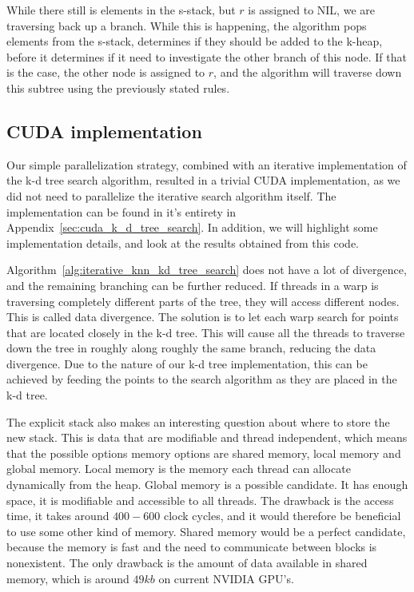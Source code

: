 While there still is elements in the s-stack, but $r$ is assigned to NIL, we are traversing back up a branch. While this is happening, the algorithm pops elements from the s-stack, determines if they should be added to the k-heap, before it determines if it need to investigate the other branch of this node. If that is the case, the other node is assigned to $r$, and the algorithm will traverse down this subtree using the previously stated rules.

\subsection{CUDA implementation} %
\label{sub:the_implementation}

Our simple parallelization strategy, combined with an iterative implementation of the k-d tree search algorithm, resulted in a trivial CUDA implementation, as we did not need to parallelize the iterative search algorithm itself. The implementation can be found in it's entirety in Appendix~\ref{sec:cuda_k_d_tree_search}. In addition, we will highlight some implementation details, and look at the results obtained from this code.

Algorithm~\ref{alg:iterative_knn_kd_tree_search} does not have a lot of divergence, and the remaining branching can be further reduced. If threads in a warp is traversing completely different parts of the tree, they will access different nodes. This is called data divergence. The solution is to let each warp search for points that are located closely in the k-d tree. This will cause all the threads to traverse down the tree in roughly along roughly the same branch, reducing the data divergence. Due to the nature of our k-d tree implementation, this can be achieved by feeding the points to the search algorithm as they are placed in the k-d tree.

The explicit stack also makes an interesting question about where to store the new stack. This is data that are modifiable and thread independent, which means that the possible options memory options are shared memory, local memory and global memory. Local memory is the memory each thread can allocate dynamically from the heap. Global memory is a possible candidate. It has enough space, it is modifiable and accessible to all threads. The drawback is the access time, it takes around $400-600$ clock cycles, and it would therefore be beneficial to use some other kind of memory. Shared memory would be a perfect candidate, because the memory is fast and the need to communicate between blocks is nonexistent. The only drawback is the amount of data available in shared memory, which is around $49 kb$ on current NVIDIA GPU's. 

